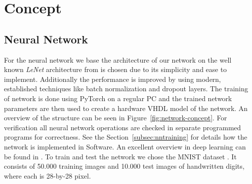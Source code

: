 \section{Concept}

\subsection{Neural Network}

For the neural network we base the architecture of our network on the well known \emph{LeNet} architecture from \cite{LeCun:1998aa} is chosen due to its simplicity and ease to implement. Additionally the performance is improved by using modern, established techniques like batch normalization \cite{Ioffe:2015aa} and dropout \cite{Srivastava:2014aa} layers. 
The training of network is done using PyTorch \cite{Paszke:2019aa} on a regular PC and the trained network parameters are then used to create a hardware VHDL model of the network. An overview of the structure can be seen in Figure~\ref{fig:network-concept}. For verification all neural network operations are checked in separate programmed programs for correctness. See the Section~\ref{subsec:nntraining} for details how the network is implemented in Software.
An excellent overview in deep learning can be found in \cite{Schmidhuber:2015aa}.
To train and test the network we chose the MNIST dataset \cite{LeCun:1998ab}. It consists of 50.000 training images and 10.000 test images of handwritten digits, where each is 28-by-28 pixel.


